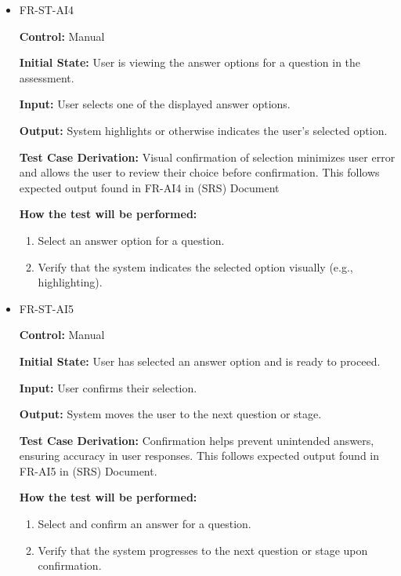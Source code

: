 \documentclass[12pt, titlepage]{article}
\begin{document}
\begin{itemize}
  \item FR-ST-AI4
    \begin{mdframed}[linewidth=0.5mm]
      \textbf{Control:} Manual \par
      \textbf{Initial State:} User is viewing the answer options for a question in the assessment. \par
      \textbf{Input:} User selects one of the displayed answer options. \par
      \textbf{Output:} System highlights or otherwise indicates the user’s selected option. \par
      \textbf{Test Case Derivation:} Visual confirmation of selection minimizes user error and allows
       the user to review their choice before confirmation. 
       This follows expected output found in FR-AI4 in (SRS) Document  \par
      \textbf{How the test will be performed:}
      \begin{enumerate}[noitemsep]
        \item Select an answer option for a question.
        \item Verify that the system indicates the selected option visually (e.g., highlighting).
      \end{enumerate}
    \end{mdframed}

  \item FR-ST-AI5
    \begin{mdframed}[linewidth=0.5mm]
      \textbf{Control:} Manual \par
      \textbf{Initial State:} User has selected an answer option and is ready to proceed. \par
      \textbf{Input:} User confirms their selection. \par
      \textbf{Output:} System moves the user to the next question or stage. \par
      \textbf{Test Case Derivation:} Confirmation helps prevent unintended answers, ensuring 
      accuracy in user responses. This follows expected output found in FR-AI5 in (SRS) Document. \par
      \textbf{How the test will be performed:}
      \begin{enumerate}[noitemsep]
        \item Select and confirm an answer for a question.
        \item Verify that the system progresses to the next question or stage upon \\ confirmation.
      \end{enumerate}
    \end{mdframed}


\end{itemize}
\end{document}
